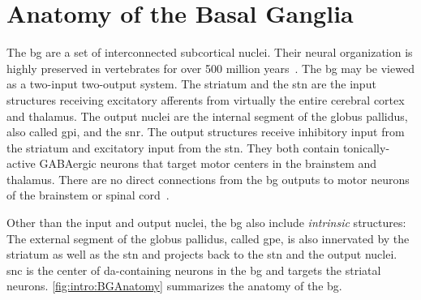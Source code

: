 \section{Anatomy of the Basal Ganglia}
\label{intro:BGAnatomy}
The \gls{bg} are a set of interconnected subcortical nuclei.
Their neural organization is highly preserved in vertebrates for over 500 million years~\cite{Grillner2016BG}.
The \gls{bg} may be viewed as a two-input two-output system.
The striatum and the \gls{stn} are the input structures receiving excitatory afferents from virtually the entire cerebral cortex and thalamus.
The output nuclei are the internal segment of the globus pallidus, also called \gls{gpi}, and the \gls{snr}.
The output structures receive inhibitory input from the striatum and excitatory input from the \gls{stn}.
They both contain tonically-active GABAergic neurons that target motor centers in the brainstem and thalamus.
There are no direct connections from the \gls{bg} outputs to motor neurons of the brainstem or spinal cord~\cite{Mink1996}.
\par
Other than the input and output nuclei, the \gls{bg} also include \emph{intrinsic} structures:
The external segment of the globus pallidus, called \gls{gpe}, is also innervated by the striatum as well as the \gls{stn} and projects back to the \gls{stn} and the output nuclei.
\Gls{snc} is the center of \gls{da}-containing neurons in the \gls{bg} and targets the striatal neurons.
\autoref{fig:intro:BGAnatomy} summarizes the anatomy of the \gls{bg}.


